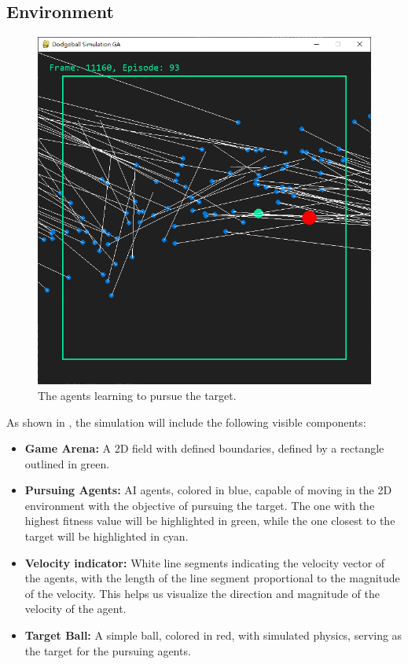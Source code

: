 \documentclass[sigconf]{acmart}
\begin{document}
\subsection{Environment}
\begin{figure}[H]
  \centering
  \includegraphics[width=0.95\linewidth]{imgs/demo01.png}
  \caption{The agents learning to pursue the target.}
  \label{fig:ball_demo}
\end{figure}
As shown in , the simulation will include the following visible components:
\begin{itemize}
  \item \textbf{Game Arena:} A 2D field with defined boundaries, defined by a rectangle outlined in green.
  \item \textbf{Pursuing Agents:} AI agents, colored in blue, capable of moving in the 2D environment with the objective of pursuing the target. The one with the highest fitness value will be highlighted in green, while the one closest to the target will be highlighted in cyan.
  \item \textbf{Velocity indicator:} White line segments indicating the velocity vector of the agents, with the length of the line segment proportional to the magnitude of the velocity. This helps us visualize the direction and magnitude of the velocity of the agent.
  \item \textbf{Target Ball:} A simple ball, colored in red, with simulated physics, serving as the target for the pursuing agents.
\end{itemize}
\end{document}
